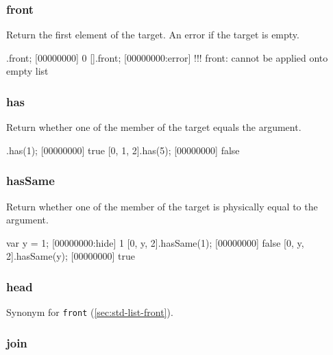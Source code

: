 
\begin{urbiscript}[firstnumber=last]

\end{urbiscript}

\subsubsection{front}
\label{sec:std-list-front}

Return the first element of the target. An error if the target is
empty.

\begin{urbiscript}[firstnumber=last]
[0, 1, 2].front;
[00000000] 0
[].front;
[00000000:error] !!! front: cannot be applied onto empty list
\end{urbiscript}

\subsubsection{has}

Return whether one of the member of the target equals the argument.

\begin{urbiscript}[firstnumber=last]
[0, 1, 2].has(1);
[00000000] true
[0, 1, 2].has(5);
[00000000] false
\end{urbiscript}

\subsubsection{hasSame}

Return whether one of the member of the target is physically equal to
the argument.

\begin{urbiscript}[firstnumber=last]
var y = 1;
[00000000:hide] 1
[0, y, 2].hasSame(1);
[00000000] false
[0, y, 2].hasSame(y);
[00000000] true
\end{urbiscript}

\subsubsection{head}

Synonym for \lstinline|front| (\autoref{sec:std-list-front}).

\subsubsection{join}

